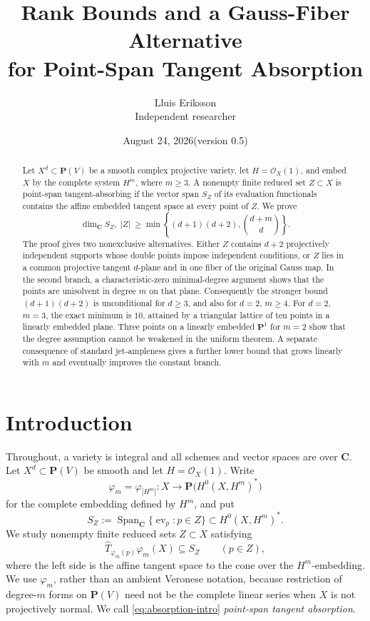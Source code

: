 \documentclass[11pt]{article}
\title{Rank Bounds and a Gauss-Fiber Alternative\\
for Point-Span Tangent Absorption}
\author{Lluis Eriksson\\\small Independent researcher}
\date{August 24, 2026\quad (version 0.5)}
\newcommand{\PP}{\mathbf P}
\newcommand{\CC}{\mathbf C}
\newcommand{\cO}{\mathcal O}
\newcommand{\Span}{\operatorname{Span}}
\begin{document}
\maketitle

\begin{abstract}
Let $X^d\subset\PP(V)$ be a smooth complex projective variety, let
$H=\cO_X(1)$, and embed $X$ by the complete system $H^m$, where $m\geq3$.
A nonempty finite reduced set $Z\subset X$ is point-span tangent-absorbing
if the vector span $S_Z$ of its evaluation functionals contains the affine
embedded tangent space at every point of $Z$.  We prove
\[
 \dim_{\CC}S_Z,\ |Z|\ \geq
 \min\left\{(d+1)(d+2),\binom{d+m}{d}\right\}.
\]
The proof gives two nonexclusive alternatives.  Either $Z$ contains $d+2$
projectively independent supports whose double points impose independent
conditions, or $Z$ lies in a common projective tangent $d$-plane and in one
fiber of the original Gauss map.  In the second branch, a characteristic-zero
minimal-degree argument shows that the points are unisolvent in degree $m$ on
that plane.  Consequently the stronger bound $(d+1)(d+2)$ is unconditional
for $d\geq3$, and also for $d=2$, $m\geq4$.  For $d=2$, $m=3$, the exact
 minimum is $10$, attained by a triangular lattice of ten points in a linearly
 embedded plane.  Three points on a linearly embedded $\PP^1$ for $m=2$ show
 that the degree assumption cannot be weakened in the uniform theorem.  A
 separate consequence of standard jet-ampleness gives a further lower bound
 that grows linearly with $m$ and eventually improves the constant branch.
\end{abstract}

\section{Introduction}

Throughout, a variety is integral and all schemes and vector spaces are over
$\CC$.  Let $X^d\subset\PP(V)$ be smooth and let $H=\cO_X(1)$.  Write
\[
 \varphi_m=\varphi_{|H^m|}:X\longrightarrow\PP\bigl(H^0(X,H^m)^*\bigr)
\]
for the complete embedding defined by $H^m$, and put
\[
 S_Z:=\Span_{\CC}\{\operatorname{ev}_p:p\in Z\}
      \subset H^0(X,H^m)^*.
\]
We study nonempty finite reduced sets $Z\subset X$ satisfying
\begin{equation}\label{eq:absorption-intro}
 \widehat T_{\varphi_m(p)}\varphi_m(X)\subseteq S_Z\qquad(p\in Z),
\end{equation}
where the left side is the affine tangent space to the cone over the
$H^m$-embedding.  We use $\varphi_m$, rather than an ambient Veronese
notation, because restriction of degree-$m$ forms on $\PP(V)$ need not be
the complete linear series when $X$ is not projectively normal.  We call
\eqref{eq:absorption-intro}
\emph{point-span tangent absorption}.
\end{document}

